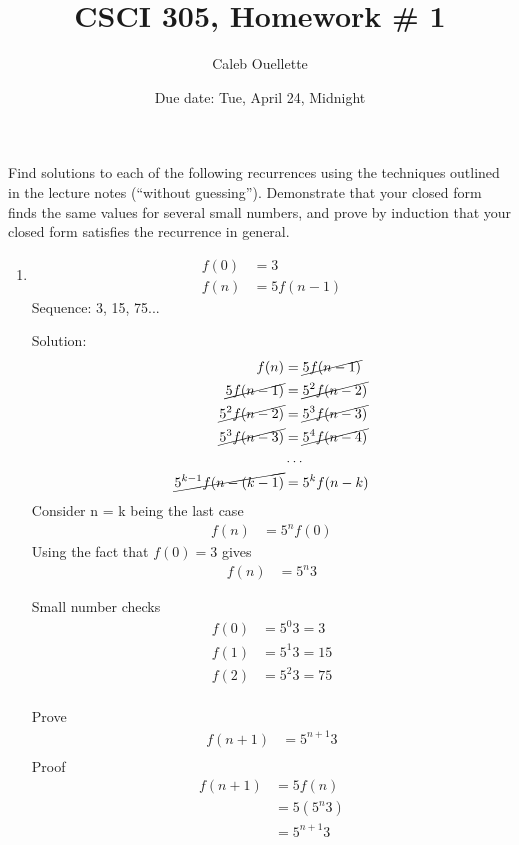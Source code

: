 \documentclass{article}
\title{CSCI 305, Homework \# 1}
\author{Caleb Ouellette}
\date{Due date: Tue, April 24, Midnight}
\begin{document}
  
  \maketitle
  
  Find solutions to each of the following recurrences
  using the techniques outlined in the lecture notes (``without guessing'').
  Demonstrate that your closed form finds the same values for several
  small numbers, and prove by induction that your closed form satisfies
  the recurrence in general.
  
  \begin{enumerate}
  \item
    \begin{align*}
      f(0) &= 3\\
      f(n) &= 5f(n-1)
    \end{align*}
    Sequence:
    3, 15, 75...
  
    Solution:
    \begin{align*}
      f(n) &= \cancel{5f(n-1)}\\
      \cancel{5f(n-1)} &= \cancel{5^2f(n-2)}\\
      \cancel{5^2f(n-2)} &= \cancel{5^3f(n-3)}\\
      \cancel{5^3f(n-3)} &= \cancel{5^4f(n-4)}\\
      &\ldots\\
      \cancel{5^{k-1}f(n-(k-1)} &= 5^{k}f(n-k)
    \end{align*}
      Consider n = k being the last case
    \begin{align*}
      f(n) &= 5^{n}f(0)
    \end{align*}
    Using the fact that $f(0)=3$ gives 
    \begin{align*}
      f(n) &= 5^{n}3
    \end{align*}
  
    Small number checks
    \begin{align*}
      f(0) &= 5^{0}3 = 3\\
      f(1) &= 5^{1}3 = 15\\
      f(2) &= 5^{2}3 = 75\\
    \end{align*}
  
  
    Prove
    \begin{align*}
      f(n + 1) &= 5^{n + 1}3 \\
    \end{align*}    
    Proof
    \begin{align*}
      f(n + 1) &= 5f(n) \\    
      &= 5(5^n3) \\
      &= 5^{n + 1}3 \\
    \end{align*}
  
  
  
  \end{enumerate}
  
  
\end{document}
